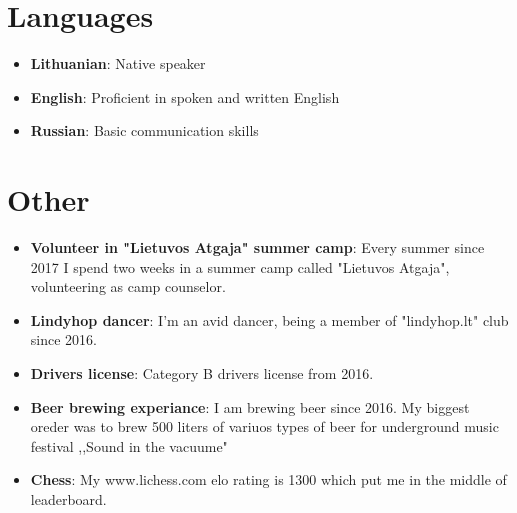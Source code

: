 \documentclass[letterpaper,11pt]{article}
\newcommand{\resumeItem}[2]{
  \item\small{
    \textbf{#1}{: #2 \vspace{-2pt}}
  }
}
\newcommand{\resumeSubItem}[2]{\resumeItem{#1}{#2}\vspace{-4pt}}
\newcommand{\resumeSubHeadingListStart}{\begin{itemize}[leftmargin=*]}
\newcommand{\resumeSubHeadingListEnd}{\end{itemize}}
\begin{document}
\section{Languages}
  \resumeSubHeadingListStart
    \item{
      \textbf{Lithuanian}{: Native speaker}
      \hfill
    }
    \item{
	\textbf{English}{: Proficient in spoken and written English}
	\hfil
	}

    \item{
	\textbf{Russian}{: Basic communication skills}
	\hfil
	}
  \resumeSubHeadingListEnd



\section{Other}
  \resumeSubHeadingListStart
    \resumeSubItem{Volunteer in "Lietuvos Atgaja" summer camp}
      {Every summer since 2017 I spend two weeks in a  summer camp called "Lietuvos Atgaja", volunteering as camp counselor.}
        \resumeSubItem{Lindyhop dancer}
      {I'm an avid dancer, being a member of "lindyhop.lt" club since 2016.}
    \resumeSubItem{Drivers license}
      {Category B drivers license from 2016.}
    \resumeSubItem{Beer brewing experiance}
      {I am brewing beer since 2016. My biggest oreder was to brew 500 liters of variuos types of beer for underground music festival ,,Sound in the vacuume"}
    \resumeSubItem{Chess}
      {My www.lichess.com elo rating is 1300 which put me in the middle of leaderboard.
}   
  \resumeSubHeadingListEnd
\end{document}
